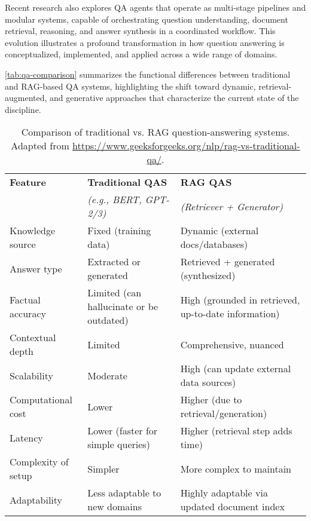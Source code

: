 \begin{spacing}{1.5}
Recent research also explores QA agents that operate as multi-stage pipelines and modular systems, capable of orchestrating question understanding, document retrieval, reasoning, and answer synthesis in a coordinated workflow. This evolution illustrates a profound transformation in how question answering is conceptualized, implemented, and applied across a wide range of domains.


\autoref{tab:qa-comparison} summarizes the functional differences between traditional and RAG-based QA systems, highlighting the shift toward dynamic, retrieval-augmented, and generative approaches that characterize the current state of the discipline. 

\begin{table}[H]
\centering
\begin{tabularx}{\textwidth}{l>{\raggedright\arraybackslash}X>{\raggedright\arraybackslash}X}
\toprule
\textbf{Feature} & \textbf{Traditional QAS} & \textbf{RAG QAS} \\
& \textit{(e.g., BERT, GPT-2/3)} & \textit{(Retriever + Generator)} \\
\midrule
Knowledge source & Fixed (training data) & Dynamic (external docs/databases) \\
Answer type & Extracted or generated & Retrieved + generated (synthesized) \\
Factual accuracy & Limited (can hallucinate or be outdated) & High (grounded in retrieved, up-to-date information) \\
Contextual depth & Limited & Comprehensive, nuanced \\
Scalability & Moderate & High (can update external data sources) \\
Computational cost & Lower & Higher (due to retrieval/generation) \\
Latency & Lower (faster for simple queries) & Higher (retrieval step adds time) \\
Complexity of setup & Simpler & More complex to maintain \\
Adaptability & Less adaptable to new domains & Highly adaptable via updated document index \\
\bottomrule
\end{tabularx}
\caption{Comparison of traditional vs. RAG question-answering systems.\\ \footnotesize{Adapted from \url{https://www.geeksforgeeks.org/nlp/rag-vs-traditional-qa/}.\nocite{noauthor_rag_2025}}}
\label{tab:qa-comparison}
\end{table}

\end{spacing}
